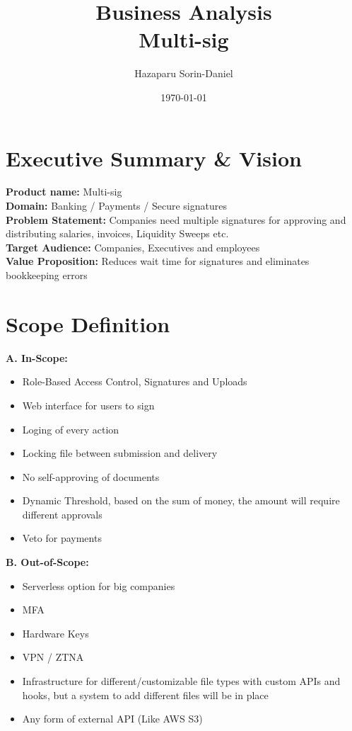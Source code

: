 \documentclass[11pt,a4paper]{article}
\title{\textbf{Business Analysis\\Multi-sig}}
\author{\LARGE{Hazaparu Sorin-Daniel}}
\date{\today}
\begin{document}
\maketitle
\newpage

\section{Executive Summary \& Vision}

\textbf{Product name:} Multi-sig \\
\textbf{Domain:} Banking / Payments / Secure signatures \\
\textbf{Problem Statement:} Companies need multiple signatures for
approving and distributing salaries, invoices, Liquidity Sweeps etc. \\
\textbf{Target Audience:} Companies, Executives and employees \\
\textbf{Value Proposition:} Reduces wait time for signatures and
eliminates bookkeeping errors

\section{Scope Definition}

\textbf{A. In-Scope:}

\begin{itemize}
\item
  Role-Based Access Control, Signatures and Uploads
\item
  Web interface for users to sign
\item
  Loging of every action
\item
  Locking file between submission and delivery
\item
  No self-approving of documents
\item
  Dynamic Threshold, based on the sum of money, the amount will require
  different approvals
\item
  Veto for payments
\end{itemize} 
\textbf{B. Out-of-Scope:}

\begin{itemize}
\item
  Serverless option for big companies
\item
  MFA
\item
  Hardware Keys
\item
  VPN / ZTNA
\item
  Infrastructure for different/customizable file types with custom APIs
  and hooks, but a system to add different files will be in place
\item
  Any form of external API (Like AWS S3)
\end{itemize}
\newpage
\end{document}
